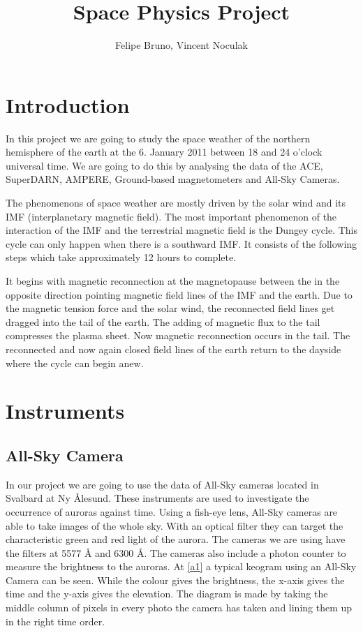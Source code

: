 \documentclass[10pt,a4paper]{article}
\author{Felipe Bruno, Vincent Noculak}
\title{Space Physics Project}
\begin{document}
\maketitle
\newpage
\tableofcontents
\newpage


\section{Introduction}

In this project we are going to study the space weather of the northern hemisphere of the earth at the 6. January 2011 between 18 and 24 o'clock universal time. We are going to do this by analysing the data of the ACE, SuperDARN, AMPERE, Ground-based magnetometers and All-Sky Cameras.

The phenomenons of space weather are mostly driven by the solar wind and its IMF (interplanetary magnetic field). The most important phenomenon of the interaction of the IMF and the terrestrial magnetic field is the Dungey cycle. This cycle can only happen when there is a southward IMF. It consists of the following steps which take approximately 12 hours to complete.

It begins with magnetic reconnection at the magnetopause between the in the opposite direction pointing magnetic field lines of the IMF and the earth. Due to the magnetic tension force and the solar wind, the reconnected field lines get dragged into the tail of the earth. The adding of magnetic flux to the tail compresses the plasma sheet. Now magnetic reconnection occurs in the tail. The reconnected and now again closed field lines of the earth return to the dayside where the cycle can begin anew.

\section{Instruments}

\subsection{All-Sky Camera}

In our project we are going to use the data of All-Sky cameras located in Svalbard at Ny Ålesund. These instruments are used to investigate the occurrence of auroras against time.
 Using a fish-eye lens, All-Sky cameras are able to take images of the whole sky. With an optical filter they can target the characteristic green and red light of the aurora. The cameras we are using have the filters at 5577 Å and 6300 Å. The cameras also include a photon counter to measure the brightness to the auroras. At \ref{a1} a typical keogram using an All-Sky Camera can be seen. While the colour gives the brightness, the x-axis gives the time and the y-axis gives the elevation. The diagram is made by taking the middle column of pixels in every photo the camera has taken and lining them up in the right time order.
\end{document}
